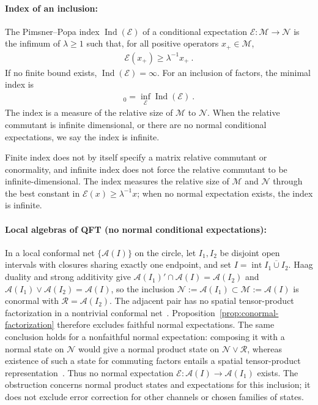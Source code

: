 \documentclass[a4paper,11pt]{article}
\theoremstyle{definition}
\newcommand{\mE}{\mathcal{E}}
\begin{document}
\paragraph{Index of an inclusion:} The Pimsner--Popa index $\operatorname{Ind}(\mE)$ of a conditional expectation $\mE:\mathcal M\to \mathcal N$ is the infimum of $\lambda\geq1$ such that, for all positive operators $x_+\in\mathcal M$,
\begin{align}
    \mE(x_+)\geq \lambda^{-1}x_+\ .
\end{align}
If no finite bound exists, $\operatorname{Ind}(\mE)=\infty$. For an inclusion of factors, the minimal index is
\begin{align}
    [\mathcal M:\mathcal N]_0=\inf_\mE \operatorname{Ind}(\mE)\ .
\end{align}
The index is a measure of the relative size of $\mathcal M$ to $\mathcal N$. When the relative commutant is infinite dimensional, or there are no normal conditional expectations, we say the index is infinite.

Finite index does not by itself specify a matrix relative commutant or conormality, and infinite index does not force the relative commutant to be infinite-dimensional. The index measures the relative size of $\mathcal M$ and $\mathcal N$ through the best constant in $\mE(x)\ge\lambda^{-1}x$; when no normal expectation exists, the index is infinite.

\paragraph{Local algebras of QFT (no normal conditional expectations):}
In a local conformal net $\{\mathcal{A}(I)\}$ on the circle, let $I_1,I_2$ be disjoint
open intervals with closures sharing exactly one endpoint, and set $I=\operatorname{int}\overline{I_1\cup I_2}$.
Haag duality and strong additivity give $\mathcal{A}(I_1)'\cap\mathcal{A}(I)=\mathcal{A}(I_2)$
and $\mathcal{A}(I_1)\vee\mathcal{A}(I_2)=\mathcal{A}(I)$, so the inclusion
$\mathcal N:=\mathcal{A}(I_1)\subset\mathcal{M}:=\mathcal{A}(I)$ is conormal with
$\mathcal R=\mathcal A(I_2)$. The adjacent pair has no spatial tensor-product
factorization in a nontrivial conformal net~\cite{Wiesbrock1993}.
Proposition~\ref{prop:conormal-factorization} therefore excludes faithful normal
expectations. The same conclusion holds for a nonfaithful normal expectation:
composing it with a normal state on $\mathcal N$ would give a normal product
state on $\mathcal N\vee\mathcal R$, whereas existence of such a state for commuting
factors entails a spatial tensor-product representation~\cite{DoplicherLongo1984}.
Thus no normal expectation $\mE:\mathcal A(I)\to\mathcal A(I_1)$ exists.
The obstruction concerns normal product states and expectations for this inclusion;
it does not exclude error correction for other channels or chosen families of states.
\end{document}
